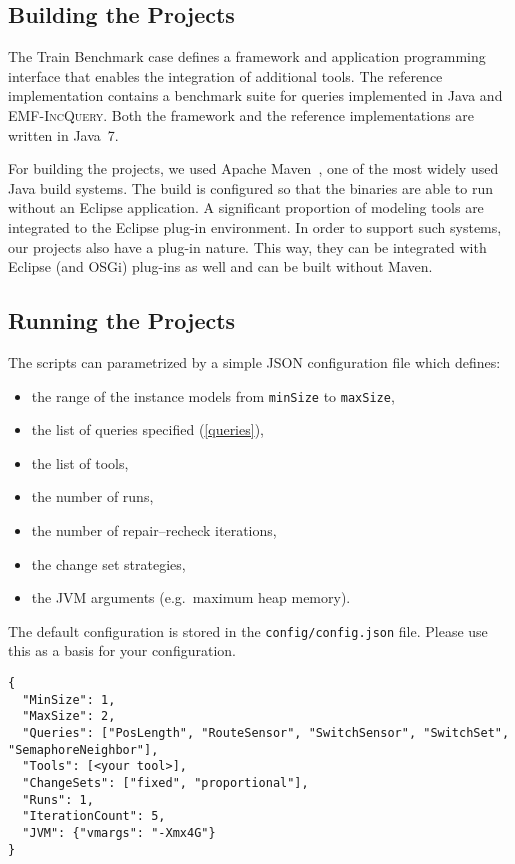 \documentclass[submission,copyright,creativecommons]{eptcs}
\newcommand{\eiq}{\textsc{EMF-IncQuery}}
\begin{document}
\subsection{Building the Projects}

The Train Benchmark case defines a framework and application programming interface that enables the integration of additional tools. The reference implementation contains a benchmark suite for queries implemented in Java and \eiq{}. Both the framework and the reference implementations are written in Java~7.

For building the projects, we used Apache Maven~\cite{Maven}, one of the most widely used Java build systems. The build is configured so that the binaries are able to run without an Eclipse application. A significant proportion of modeling tools are integrated to the Eclipse plug-in environment. In order to support such systems, our projects also have a plug-in nature. This way, they can be integrated with Eclipse (and OSGi) plug-ins as well and can be built without Maven.

\subsection{Running the Projects}

The scripts can parametrized by a simple JSON configuration file which defines:

\begin{itemize}
  \item the range of the instance models from \texttt{minSize} to \texttt{maxSize},
  \item the list of queries specified (\autoref{queries}),
  \item the list of tools,
  \item the number of runs,
  \item the number of repair--recheck iterations,
  \item the change set strategies,
  \item the JVM arguments (e.g.\ maximum heap memory).
\end{itemize}

The default configuration is stored in the \texttt{config/config.json} file. Please use this as a basis for your configuration.

\begin{lstlisting}
{
  "MinSize": 1,
  "MaxSize": 2,
  "Queries": ["PosLength", "RouteSensor", "SwitchSensor", "SwitchSet", "SemaphoreNeighbor"],
  "Tools": [<your tool>],
  "ChangeSets": ["fixed", "proportional"],
  "Runs": 1,
  "IterationCount": 5,
  "JVM": {"vmargs": "-Xmx4G"}
}
\end{lstlisting}
\end{document}
